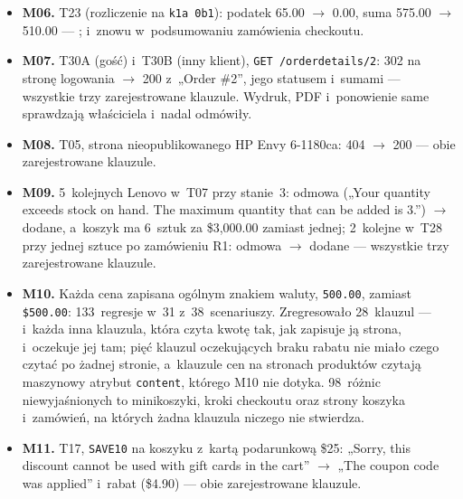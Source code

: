 \begin{itemize}
  \item \textbf{M06.} T23 (rozliczenie na \texttt{k1a 0b1}): podatek 65.00 $\rightarrow$
    0.00, suma 575.00 $\rightarrow$ 510.00 --- ; i~znowu
    w~podsumowaniu zamówienia checkoutu.
  \item \textbf{M07.} T30A (gość) i~T30B (inny klient), \texttt{GET /orderdetails/2}: 302 na
    stronę logowania $\rightarrow$ 200 z~„Order \#2”, jego statusem i~sumami --- wszystkie
    trzy zarejestrowane klauzule. Wydruk, PDF i~ponowienie same sprawdzają właściciela
    i~nadal odmówiły.
  \item \textbf{M08.} T05, strona nieopublikowanego HP Envy 6-1180ca: 404 $\rightarrow$ 200
    --- obie zarejestrowane klauzule.
  \item \textbf{M09.} 5~kolejnych Lenovo w~T07 przy stanie~3: odmowa („Your quantity exceeds
    stock on hand. The maximum quantity that can be added is 3.”) $\rightarrow$ dodane,
    a~koszyk ma 6~sztuk za \$3,000.00 zamiast jednej; 2~kolejne w~T28 przy jednej sztuce po
    zamówieniu R1: odmowa $\rightarrow$ dodane --- wszystkie trzy zarejestrowane klauzule.
  \item \textbf{M10.} Każda cena zapisana ogólnym znakiem waluty,
    \texttt{\textcurrency{}500.00}, zamiast \texttt{\$500.00}: 133~regresje w~31
    z~38~scenariuszy. Zregresowało 28~klauzul --- 
    i~każda inna klauzula, która czyta kwotę tak, jak zapisuje ją strona, i~oczekuje jej
    tam; pięć klauzul oczekujących braku rabatu nie miało czego czytać po żadnej stronie,
    a~klauzule cen na stronach produktów czytają maszynowy atrybut \texttt{content}, którego
    M10 nie dotyka. 98~różnic niewyjaśnionych to minikoszyki, kroki checkoutu oraz strony
    koszyka i~zamówień, na których żadna klauzula niczego nie stwierdza.
  \item \textbf{M11.} T17, \texttt{SAVE10} na koszyku z~kartą podarunkową \$25: „Sorry, this
    discount cannot be used with gift cards in the cart” $\rightarrow$ „The coupon code was
    applied” i~rabat (\$4.90) --- obie zarejestrowane klauzule.
\end{itemize}

